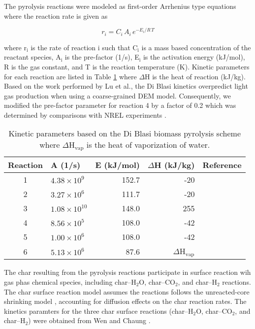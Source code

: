 \noindent The pyrolysis reactions were modeled as first-order Arrhenius type equations where the reaction rate is given as

\begin{equation}
    r_i = C_i\,A_i\,e^{-E_i / R\,T}
\end{equation}

\noindent where r$_\text{i}$ is the rate of reaction i such that C$_\text{i}$ is a mass based concentration of the reactant species, A$_\text{i}$ is the pre-factor (1/s), E$_\text{i}$ is the activation energy (kJ/mol), R is the gas constant, and T is the reaction temperature (K). Kinetic parameters for each reaction are listed in Table \ref{tab:kinetic-params} where $\Delta$H is the heat of reaction (kJ/kg). Based on the work performed by Lu et al.\cite{lu2020bridging}, the Di Blasi kinetics overpredict light gas production when using a coarse-grained DEM model. Consequently, we modified the pre-factor parameter for reaction 4 by a factor of 0.2 which was determined by comparisons with NREL experiments \cite{French-2021}.

\begin{table}[H]
    \centering
    \caption{Kinetic parameters based on the Di Blasi biomass pyrolysis scheme where $\Delta$H$_\text{vap}$ is the heat of vaporization of water.}
    \begin{tabular}{clrrr}
        \toprule
        Reaction & A (1/s) & E (kJ/mol) & $\Delta$H (kJ/kg) & Reference \\
        \midrule
        1 & $4.38 \times 10^9$    & 152.7 & -20                    & \cite{Blasi-2001} \\
        2 & $3.27 \times 10^6$    & 111.7 & -20                    & \cite{Blasi-2001} \\
        3 & $1.08 \times 10^{10}$ & 148.0 & 255                    & \cite{Blasi-2001} \\
        4 & $8.56 \times 10^5$    & 108.0 & -42                    & \cite{Blasi-1993,lu2020bridging} \\
        5 & $1.00 \times 10^6$    & 108.0 & -42                    & \cite{Blasi-1993} \\
        6 & $5.13 \times 10^6$    & 87.6  & $\Delta$H$_\text{vap}$ & \cite{Chan-1985} \\
        \bottomrule
    \end{tabular}
    \label{tab:kinetic-params}
\end{table}

\noindent The char resulting from the pyrolysis reactions participate in surface reaction wih gas phas chemical species, including char--H$_2$O, char--CO$_2$, and char--H$_2$ reactions. The char surface reaction model assumes the reactions follows the unreacted-core shrinking model \cite{Chyou-2013}, accounting for diffusion effects on the char reaction rates. The kinetics paramters for the three char surface reactions (char--H$_2$O, char--CO$_2$, and char--H$_2$) were obtained from Wen and Chaung \cite{Wen1979entr}.

